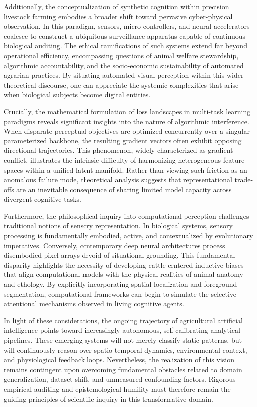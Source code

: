 \documentclass[Times,12pt,oneside,openany,print,index]{report}
\begin{document}
Additionally, the conceptualization of synthetic cognition within precision livestock farming embodies a broader shift toward pervasive cyber-physical observation. In this paradigm, sensors, micro-controllers, and neural accelerators coalesce to construct a ubiquitous surveillance apparatus capable of continuous biological auditing. The ethical ramifications of such systems extend far beyond operational efficiency, encompassing questions of animal welfare stewardship, algorithmic accountability, and the socio-economic sustainability of automated agrarian practices. By situating automated visual perception within this wider theoretical discourse, one can appreciate the systemic complexities that arise when biological subjects become digital entities.

Crucially, the mathematical formulation of loss landscapes in multi-task learning paradigms reveals significant insights into the nature of algorithmic interference. When disparate perceptual objectives are optimized concurrently over a singular parameterized backbone, the resulting gradient vectors often exhibit opposing directional trajectories. This phenomenon, widely characterized as gradient conflict, illustrates the intrinsic difficulty of harmonizing heterogeneous feature spaces within a unified latent manifold. Rather than viewing such friction as an anomalous failure mode, theoretical analysis suggests that representational trade-offs are an inevitable consequence of sharing limited model capacity across divergent cognitive tasks.

Furthermore, the philosophical inquiry into computational perception challenges traditional notions of sensory representation. In biological systems, sensory processing is fundamentally embodied, active, and contextualized by evolutionary imperatives. Conversely, contemporary deep neural architectures process disembodied pixel arrays devoid of situational grounding. This fundamental disparity highlights the necessity of developing cattle-centered inductive biases that align computational models with the physical realities of animal anatomy and ethology. By explicitly incorporating spatial localization and foreground segmentation, computational frameworks can begin to simulate the selective attentional mechanisms observed in living cognitive agents.

In light of these considerations, the ongoing trajectory of agricultural artificial intelligence points toward increasingly autonomous, self-calibrating analytical pipelines. These emerging systems will not merely classify static patterns, but will continuously reason over spatio-temporal dynamics, environmental context, and physiological feedback loops. Nevertheless, the realization of this vision remains contingent upon overcoming fundamental obstacles related to domain generalization, dataset shift, and unmeasured confounding factors. Rigorous empirical auditing and epistemological humility must therefore remain the guiding principles of scientific inquiry in this transformative domain.
\end{document}
